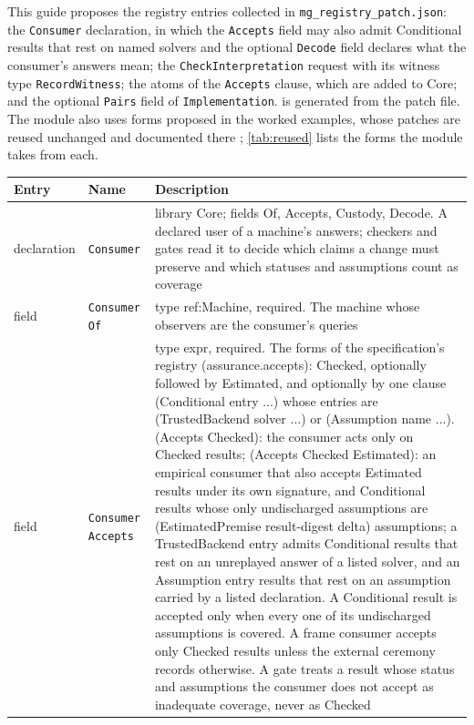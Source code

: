 \documentclass[11pt]{article}
\newcommand{\fpath}[1]{\nolinkurl{#1}}
\newcommand{\code}[1]{\texttt{#1}}
\theoremstyle{definition}
\theoremstyle{plain}
\begin{document}
This guide proposes the registry entries collected in \fpath{mg_registry_patch.json}: the
\code{Consumer} declaration, in which the \code{Accepts} field may also admit Conditional results
that rest on named solvers and the optional \code{Decode} field declares what the consumer's
answers mean; the \code{CheckInterpretation} request with its witness type \code{RecordWitness};
the atoms of the \code{Accepts} clause, which are added to Core; and the optional \code{Pairs} field
of \code{Implementation}.  is generated from the patch file. The module also uses
forms proposed in the worked examples, whose patches are reused unchanged and documented there
\cite[Appendix~B]{worked}; \cref{tab:reused} lists the forms the module takes from each.
\begin{footnotesize}
\begin{longtable}{>{\raggedright\arraybackslash}p{2.0cm}>{\raggedright\arraybackslash}p{3.6cm}>{\raggedright\arraybackslash}p{8.6cm}}
\toprule
Entry & Name & Description\\
\midrule
\endhead
declaration & \code{Consumer} & library Core; fields Of, Accepts, Custody, Decode. A declared user of a machine's answers; checkers and gates read it to decide which claims a change must preserve and which statuses and assumptions count as coverage\\
field & \code{Consumer Of} & type ref:\allowbreak{}Machine, required. The machine whose observers are the consumer's queries\\
field & \code{Consumer Accepts} & type expr, required. The forms of the specification's registry (assurance.accepts):\allowbreak{} Checked, optionally followed by Estimated, and optionally by one clause (Conditional entry ...) whose entries are (TrustedBackend solver ...) or (Assumption name ...). (Accepts Checked):\allowbreak{} the consumer acts only on Checked results; (Accepts Checked Estimated):\allowbreak{} an empirical consumer that also accepts Estimated results under its own signature, and Conditional results whose only undischarged assumptions are (EstimatedPremise result-digest delta) assumptions; a TrustedBackend entry admits Conditional results that rest on an unreplayed answer of a listed solver, and an Assumption entry results that rest on an assumption carried by a listed declaration. A Conditional result is accepted only when every one of its undischarged assumptions is covered. A frame consumer accepts only Checked results unless the external ceremony records otherwise. A gate treats a result whose status and assumptions the consumer does not accept as inadequate coverage, never as Checked\\

\end{longtable}
\end{footnotesize}
\end{document}
